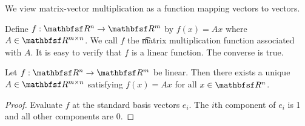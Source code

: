 
We view matrix-vector multiplication as a function mapping vectors to vectors.


Define $f: \R^n \to \R^m$ by $f(x) = Ax$ where $A \in \R^{m \times n}$.
We call $f$ the \t{matrix multiplication function} associated with $A$.
It is easy to verify that $f$ is a linear function.
The converse is true.
\begin{proposition}
Let $f: \R^n \to \R^m$ be linear. Then there exists a unique $A \in \R^{m \times n}$ satisfying $f(x) = Ax$ for all $x \in \R^n$.
\end{proposition}
\begin{proof}
Evaluate $f$ at the standard basis vectors $e_i$.
The $i$th component of $e_i$ is 1 and all other components are 0.
\end{proof}

\blankpage
